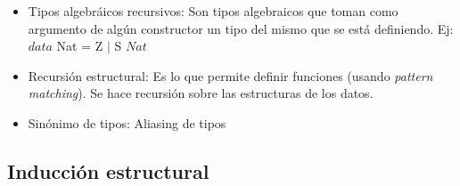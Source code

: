 \documentclass[a4paper,10pt]{article}
\begin{document}
\begin{itemize}
\begin{itemize}
\begin{itemize}
			\end{itemize}
			\item Tipos algebráicos recursivos: Son tipos algebraicos que toman como argumento de algún constructor un tipo del mismo que se está definiendo. Ej: $data$ Nat = Z $|$ S $Nat$
			\item Recursión estructural: Es lo que permite definir funciones (usando \textit{pattern matching}). Se hace recursión sobre las estructuras de los datos.
			\item Sinónimo de tipos: Aliasing de tipos
		\end{itemize}
	\end{itemize}
\subsection{Inducción estructural}
\end{document}
